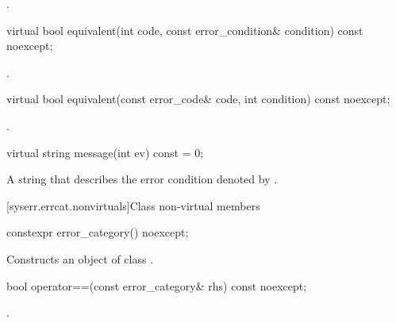 \begin{itemdescr}
\pnum
\returns
{}.
\end{itemdescr}

%
\begin{itemdecl}
virtual bool equivalent(int code, const error_condition& condition) const noexcept;
\end{itemdecl}

\begin{itemdescr}
\pnum
\returns {}.
\end{itemdescr}

%
\begin{itemdecl}
virtual bool equivalent(const error_code& code, int condition) const noexcept;
\end{itemdecl}

\begin{itemdescr}
\pnum
\returns {}.
\end{itemdescr}

%
\begin{itemdecl}
virtual string message(int ev) const = 0;
\end{itemdecl}

\begin{itemdescr}
\pnum
\returns A string that describes the error condition denoted by .
\end{itemdescr}

[syserr.errcat.nonvirtuals]{Class  non-virtual members}

%
\begin{itemdecl}
constexpr error_category() noexcept;
\end{itemdecl}

\begin{itemdescr}
\pnum
\effects Constructs an object of class .
\end{itemdescr}

%
\begin{itemdecl}
bool operator==(const error_category& rhs) const noexcept;
\end{itemdecl}

\begin{itemdescr}
\pnum
\returns {}.
\end{itemdescr}

